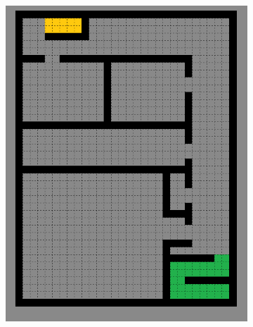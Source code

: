 \begin{figure}[H]
\begin{subfigure}[b]{0.3\textwidth}
        \includegraphics[width=\textwidth]{figures/p2.png}
        \caption{}
        \label{fig:tiger}
    \end{subfigure}
    ~
    \begin{subfigure}[b]{0.3\textwidth}

\end{subfigure}
\end{figure}
